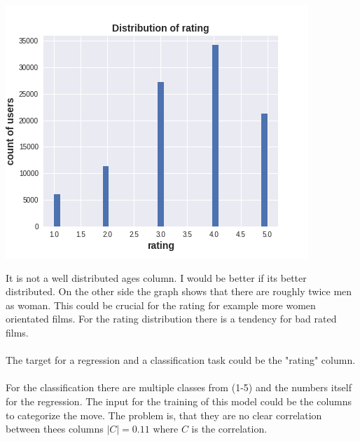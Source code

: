 \documentclass[11pt,a4paper]{article}
\begin{document}
\begin{minipage}[t]{0.33\textwidth}
	\includegraphics[width=\textwidth]{Bilder/rating_dist.png}
\end{minipage}

\noindent
It is not a well distributed ages column. I would be better if its better distributed. On the other side the graph shows that there are roughly twice men as woman. This could be crucial for the rating for example more women orientated films. For the rating distribution there is a tendency for bad rated films.\\\\
The target for a regression and a classification task could be the "rating" column.\\\\
For the classification there are multiple classes from (1-5) and the numbers itself for the regression. The input for the training of this model could be the columns to categorize the move. The problem is, that they are no clear correlation between thees columns $|C| = 0.11$ where $C$ is the correlation.
\end{document}
